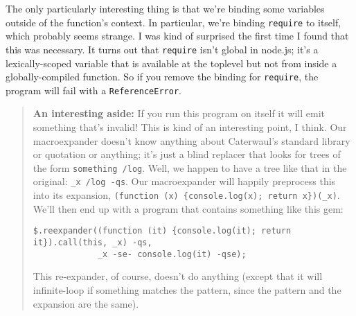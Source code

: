 \documentclass{report}
\begin{document}

    The only particularly interesting thing is that we're binding some variables outside of the function's context. In particular, we're binding {\tt require} to itself, which probably seems
    strange. I was kind of surprised the first time I found that this was necessary. It turns out that {\tt require} isn't global in node.js; it's a lexically-scoped variable that is available
    at the toplevel but not from inside a globally-compiled function. So if you remove the binding for {\tt require}, the program will fail with a {\tt ReferenceError}.

\begin{quote}
{\bf An interesting aside:} If you run this program on itself it will emit something that's invalid! This is kind of an interesting point, I think. Our macroexpander doesn't know
anything about Caterwaul's standard library or quotation or anything; it's just a blind replacer that looks for trees of the form {\tt something /log}. Well, we happen to have a tree
like that in the original: \verb|_x /log -qs|. Our macroexpander will happily preprocess this into its expansion, \verb|(function (x) {console.log(x); return x})(_x)|. We'll then end up
with a program that contains something like this gem:

\begin{verbatim}
$.reexpander((function (it) {console.log(it); return it}).call(this, _x) -qs,
             _x -se- console.log(it) -qse);
\end{verbatim}

This re-expander, of course, doesn't do anything (except that it will infinite-loop if something matches the pattern, since the pattern and the expansion are the same).
\end{quote}
\end{document}

